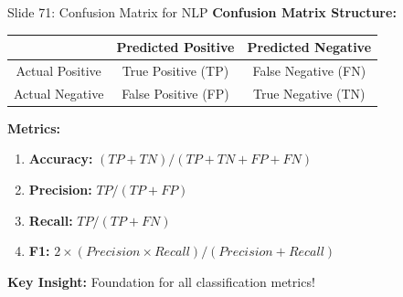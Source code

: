 \documentclass[8pt]{beamer}
\begin{document}
	\begin{frame}{Slide 71: Confusion Matrix for NLP}
		\fontsize{6.5}{7.5}\selectfont
		\textbf{Confusion Matrix Structure:}
		\begin{tabular}{|c|c|c|}
			\hline
			& Predicted Positive & Predicted Negative \\
			\hline
			Actual Positive & True Positive (TP) & False Negative (FN) \\
			Actual Negative & False Positive (FP) & True Negative (TN) \\
			\hline
		\end{tabular}
		
		\vspace{0.1cm}
		\textbf{Metrics:}
		\begin{enumerate}
			\item \textbf{Accuracy:} $(TP + TN) / (TP + TN + FP + FN)$
			\item \textbf{Precision:} $TP / (TP + FP)$
			\item \textbf{Recall:} $TP / (TP + FN)$
			\item \textbf{F1:} $2 \times (Precision \times Recall) / (Precision + Recall)$
		\end{enumerate}
		
		\textcolor{myblue}{\textbf{Key Insight:}} Foundation for all classification metrics!
	\end{frame}
	
\end{document}
